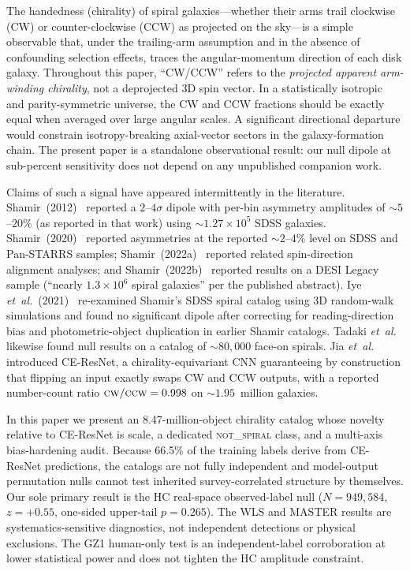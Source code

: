 \documentclass[aps,prd,twocolumn,superscriptaddress,preprintnumbers,nofootinbib,longbibliography,floatfix]{revtex4-2}
\newcommand{\CW}{\textsc{cw}}
\newcommand{\CCW}{\textsc{ccw}}
\newcommand{\NS}{\textsc{not\_spiral}}
\newcommand{\sigmaunit}{\sigma}
\begin{document}
The handedness (chirality) of spiral galaxies---whether their arms trail clockwise (CW) or counter-clockwise (CCW) as projected on the sky---is a simple observable that, under the trailing-arm assumption and in the absence of confounding selection effects, traces the angular-momentum direction of each disk galaxy. Throughout this paper, ``CW/CCW'' refers to the \emph{projected apparent arm-winding chirality}, not a deprojected 3D spin vector. In a statistically isotropic and parity-symmetric universe, the CW and CCW fractions should be exactly equal when averaged over large angular scales. A significant directional departure would constrain isotropy-breaking axial-vector sectors in the galaxy-formation chain. The present paper is a standalone observational result: our null dipole at sub-percent sensitivity does not depend on any unpublished companion work.

Claims of such a signal have appeared intermittently in the literature. Shamir~(2012)~\cite{Shamir:2012} reported a $2\text{--}4\sigmaunit$ dipole with per-bin asymmetry amplitudes of $\sim\!5$--$20\%$ (as reported in that work) using $\sim\!1.27\!\times\!10^{5}$ SDSS galaxies. Shamir~(2020)~\cite{Shamir:2020} reported asymmetries at the reported $\sim\!2$--$4\%$ level on SDSS and Pan-STARRS samples; Shamir~(2022a)~\cite{Shamir:2022} reported related spin-direction alignment analyses; and Shamir~(2022b)~\cite{Shamir:2022DESI} reported results on a DESI Legacy sample (``nearly $1.3\!\times\!10^{6}$ spiral galaxies'' per the published abstract). Iye \textit{et~al.}~(2021)~\cite{Iye:2021} re-examined Shamir's SDSS spiral catalog using 3D random-walk simulations and found no significant dipole after correcting for reading-direction bias and photometric-object duplication in earlier Shamir catalogs. Tadaki \textit{et~al.}~\cite{Tadaki:2020} likewise found null results on a catalog of $\sim\!80{,}000$ face-on spirals. Jia \textit{et~al.}~\cite{Jia:2023} introduced CE-ResNet, a chirality-equivariant CNN guaranteeing by construction that flipping an input exactly swaps CW and CCW outputs, with a reported number-count ratio $\CW/\CCW = 0.998$ on $\sim\!1.95$~million galaxies.

In this paper we present an 8.47-million-object chirality catalog whose novelty relative to CE-ResNet is scale, a dedicated \NS{} class, and a multi-axis bias-hardening audit. Because 66.5\% of the training labels derive from CE-ResNet predictions, the catalogs are not fully independent and model-output permutation nulls cannot test inherited survey-correlated structure by themselves. Our sole primary result is the HC real-space observed-label null ($N=949{,}584$, $z=+0.55$, one-sided upper-tail $p=0.265$). The WLS and MASTER results are systematics-sensitive diagnostics, not independent detections or physical exclusions. The GZ1 human-only test is an independent-label corroboration at lower statistical power and does not tighten the HC amplitude constraint.
\end{document}
